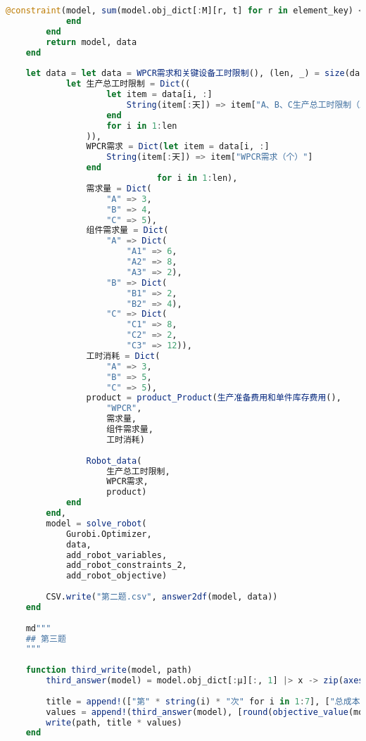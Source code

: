 \begin{appendices}
\begin{lstlisting}[language=julia]
                @constraint(model, sum(model.obj_dict[:M][r, t] for r in element_key) <= data.:生产总工时限制[int2week(t)])
            end
        end
        return model, data
    end
    
    let data = let data = WPCR需求和关键设备工时限制(), (len, _) = size(data)
            let 生产总工时限制 = Dict((
                    let item = data[i, :]
                        String(item[:天]) => item["A、B、C生产总工时限制（工时）"]
                    end
                    for i in 1:len
                )),
                WPCR需求 = Dict(let item = data[i, :]
                    String(item[:天]) => item["WPCR需求（个）"]
                end
                              for i in 1:len),
                需求量 = Dict(
                    "A" => 3,
                    "B" => 4,
                    "C" => 5),
                组件需求量 = Dict(
                    "A" => Dict(
                        "A1" => 6,
                        "A2" => 8,
                        "A3" => 2),
                    "B" => Dict(
                        "B1" => 2,
                        "B2" => 4),
                    "C" => Dict(
                        "C1" => 8,
                        "C2" => 2,
                        "C3" => 12)),
                工时消耗 = Dict(
                    "A" => 3,
                    "B" => 5,
                    "C" => 5),
                product = product_Product(生产准备费用和单件库存费用(),
                    "WPCR",
                    需求量,
                    组件需求量,
                    工时消耗)
    
                Robot_data(
                    生产总工时限制,
                    WPCR需求,
                    product)
            end
        end,
        model = solve_robot(
            Gurobi.Optimizer,
            data,
            add_robot_variables,
            add_robot_constraints_2,
            add_robot_objective)
    
        CSV.write("第二题.csv", answer2df(model, data))
    end
    
    md"""
    ## 第三题
    """
    
    function third_write(model, path)
        third_answer(model) = model.obj_dict[:μ][:, 1] |> x -> zip(axes(x)[1], Vector(value.(x))) |> collect |> x -> filter(x -> x[2] == 1, x) |> x -> map(x -> x[1], x)
    
        title = append!(["第" * string(i) * "次" for i in 1:7], ["总成本\n"]) |> x -> join(x, ", ")
        values = append!(third_answer(model), [round(objective_value(model))]) |> x -> join(x, ", ")
        write(path, title * values)
    end
    

\end{lstlisting}
\end{appendices}
